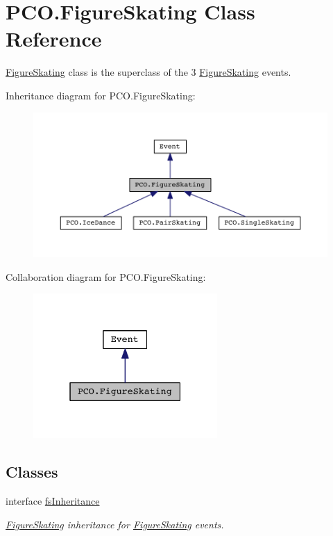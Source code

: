 \hypertarget{classPCO_1_1FigureSkating}{\section{P\+C\+O.\+Figure\+Skating Class Reference}
\label{classPCO_1_1FigureSkating}
}


\hyperlink{classPCO_1_1FigureSkating}{Figure\+Skating} class is the superclass of the 3 \hyperlink{classPCO_1_1FigureSkating}{Figure\+Skating} events.  




Inheritance diagram for P\+C\+O.\+Figure\+Skating\+:\nopagebreak
\begin{figure}[H]
\begin{center}
\leavevmode
\includegraphics[width=350pt]{classPCO_1_1FigureSkating__inherit__graph}
\end{center}
\end{figure}


Collaboration diagram for P\+C\+O.\+Figure\+Skating\+:\nopagebreak
\begin{figure}[H]
\begin{center}
\leavevmode
\includegraphics[width=199pt]{classPCO_1_1FigureSkating__coll__graph}
\end{center}
\end{figure}
\subsection*{Classes}
\begin{DoxyCompactItemize}
\item 
interface \hyperlink{interfacePCO_1_1FigureSkating_1_1fsInheritance}{fs\+Inheritance}
\begin{DoxyCompactList}\small\item\em \hyperlink{classPCO_1_1FigureSkating}{Figure\+Skating} inheritance for \hyperlink{classPCO_1_1FigureSkating}{Figure\+Skating} events. \end{DoxyCompactList}\end{DoxyCompactItemize}
